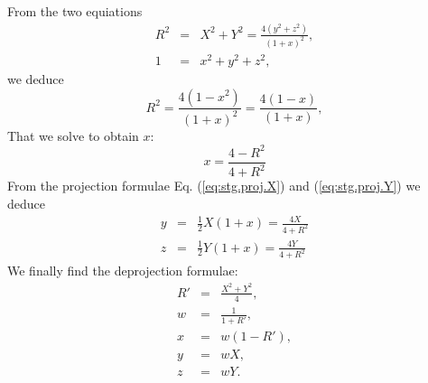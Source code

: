     From the two equiations
    \begin{eqnarray}
      R^2 & = & X^2 + Y^2 = \frac{4(y^2 + z^2)}{(1 + x)^2}, \\
      1 & = & x^2 + y^2 + z^2,
    \end{eqnarray}
    we deduce
    \begin{equation}
      R^2 = \frac{4(1 - x^2)}{(1 + x)^2} = \frac{4(1 - x)}{(1 + x)},
    \end{equation}
    That we solve to obtain $x$:
    \begin{equation}
      x = \frac{4 - R^2}{4 + R^2}
    \end{equation}
    From the projection formulae Eq. (\ref{eq:stg.proj.X}) and (\ref{eq:stg.proj.Y}) we deduce
    \begin{eqnarray}
      y & = & \frac{1}{2}X(1 + x) = \frac{4X}{4 + R^2}\\
      z & = & \frac{1}{2}Y(1 + x) = \frac{4Y}{4 + R^2}
    \end{eqnarray}
    We finally find the deprojection formulae:
    \begin{eqnarray}
      R' & = & \frac{X^2 + Y^2}{4}, \\
      w & = & \frac{1}{1 + R'}, \\
      x & = & w(1-R'), \label{eq:stg.deproj.x} \\
      y & = & wX, \label{eq:stg.deproj.y}\\
      z & = & wY. \label{eq:stg.deproj.z}
    \end{eqnarray}



